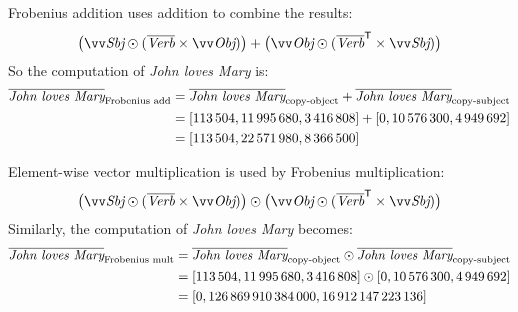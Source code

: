 Frobenius addition uses addition to combine the results:
\begin{equation}
  \big(\ov{\text{\it Sbj}} \odot (\overline{\text{\it Verb}} \times \ov{\text{\it Obj}})\big) + %
  \big(\ov{\text{\it Obj}} \odot (\overline{\text{\it Verb}}^{\mathsf{T}} \times \ov{\text{\it Sbj}})\big)
\end{equation}
%
So the computation of \textit{John loves Mary} is:
%
\begin{align*}
  \overline{\text{\it John loves Mary}}_{\text{Frobenius add}} &=  \overline{\text{\it John loves Mary}}_{\text{copy-object}} +  \overline{\text{\it John loves Mary}}_{\text{copy-subject}}\\
                                                         &= [113\,504, 11\,995\,680,  3\,416\,808] + [0, 10\,576\,300,  4\,949\,692] \\
                                                         &= [113\,504, 22\,571\,980,  8\,366\,500]
\end{align*}

Element-wise vector multiplication is used by Frobenius multiplication:%
\begin{equation}
  \big(\ov{\text{\it Sbj}} \odot (\overline{\text{\it Verb}} \times \ov{\text{\it Obj}})\big) \odot %
  \big(\ov{\text{\it Obj}} \odot (\overline{\text{\it Verb}}^{\mathsf{T}} \times \ov{\text{\it Sbj}})\big)
\end{equation}
%
Similarly, the computation of \textit{John loves Mary} becomes:
%
\begin{align*}
  \overline{\text{\it John loves Mary}}_{\text{Frobenius mult}} &=  \overline{\text{\it John loves Mary}}_{\text{copy-object}} \odot \overline{\text{\it John loves Mary}}_{\text{copy-subject}}\\
                                                         &= [113\,504, 11\,995\,680,  3\,416\,808] \odot [0, 10\,576\,300,  4\,949\,692] \\
                                                         &= [0, 126\,869\,910\,384\,000,  16\,912\,147\,223\,136]
\end{align*}

